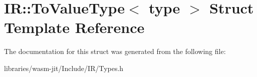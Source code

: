 \hypertarget{struct_i_r_1_1_to_value_type}{}\section{IR\+:\+:To\+Value\+Type$<$ type $>$ Struct Template Reference}
\label{struct_i_r_1_1_to_value_type}


The documentation for this struct was generated from the following file\+:\begin{DoxyCompactItemize}
\item 
libraries/wasm-\/jit/\+Include/\+I\+R/Types.\+h\end{DoxyCompactItemize}
